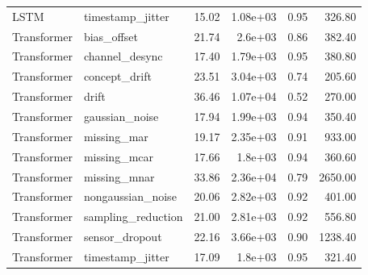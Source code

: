 \begin{table}
\begin{tabular}{llrrrr}
LSTM & timestamp\_jitter & 15.02 & 1.08e+03 & 0.95 & 326.80 \\
Transformer & bias\_offset & 21.74 & 2.6e+03 & 0.86 & 382.40 \\
Transformer & channel\_desync & 17.40 & 1.79e+03 & 0.95 & 380.80 \\
Transformer & concept\_drift & 23.51 & 3.04e+03 & 0.74 & 205.60 \\
Transformer & drift & 36.46 & 1.07e+04 & 0.52 & 270.00 \\
Transformer & gaussian\_noise & 17.94 & 1.99e+03 & 0.94 & 350.40 \\
Transformer & missing\_mar & 19.17 & 2.35e+03 & 0.91 & 933.00 \\
Transformer & missing\_mcar & 17.66 & 1.8e+03 & 0.94 & 360.60 \\
Transformer & missing\_mnar & 33.86 & 2.36e+04 & 0.79 & 2650.00 \\
Transformer & nongaussian\_noise & 20.06 & 2.82e+03 & 0.92 & 401.00 \\
Transformer & sampling\_reduction & 21.00 & 2.81e+03 & 0.92 & 556.80 \\
Transformer & sensor\_dropout & 22.16 & 3.66e+03 & 0.90 & 1238.40 \\
Transformer & timestamp\_jitter & 17.09 & 1.8e+03 & 0.95 & 321.40 \\
\bottomrule
\end{tabular}
\end{table}
